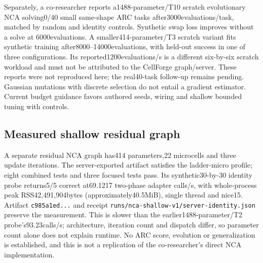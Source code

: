 \documentclass[11pt]{article}
\begin{document}
Separately, a co-researcher reports a1488-parameter/T10 scratch evolutionary NCA
solving0/40 small same-shape ARC tasks after3000evaluations/task, matched by
random and identity controls. Synthetic swap loss improves without a solve at
6000evaluations. A smaller414-parameter/T3 scratch variant fits synthetic training
after8000--14000evaluations, with held-out success in one of three configurations.
Its reported1200evaluations/s is a different six-by-six scratch workload and
must not be attributed to the CellForge graph/server. These reports were not
reproduced here; the real40-task follow-up remains pending. Gaussian mutations
with discrete selection do not entail a gradient estimator. Current budget
guidance favors authored seeds, wiring and shallow bounded tuning with controls.

\subsection{Measured shallow residual graph}
A separate residual NCA graph has414 parameters,22 microcells and three update
iterations. The server-exported artifact satisfies the ladder-micro profile;
eight combined tests and three focused tests pass. Its synthetic30-by-30 identity
probe returns5/5 correct at69.1217 two-phase adapter calls/s, with whole-process
peak RSS42{,}491{,}904bytes (approximately40.5MiB), single thread and nice15.
Artifact \texttt{c985a1ed...} and receipt
\texttt{runs/nca-shallow-v1/server-identity.json} preserve the measurement.
This is slower than the earlier1488-parameter/T2 probe's93.23calls/s; architecture,
iteration count and dispatch differ, so parameter count alone does not explain
runtime. No ARC score, evolution or generalization is established, and this is
not a replication of the co-researcher's direct NCA implementation.
\end{document}
